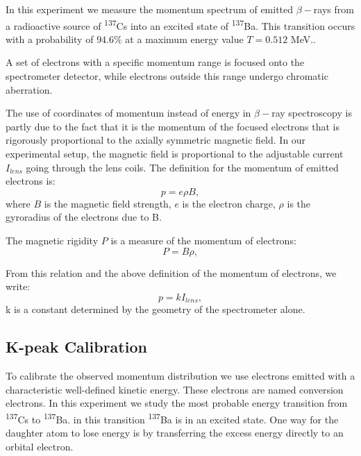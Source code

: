 \documentclass[10pt, a4paper]{article}
\begin{document}
\begin{multicols}{2}
In this experiment we measure the momentum spectrum of emitted $\beta-$rays from a radioactive source of \textsuperscript{137}Cs into an excited state of \textsuperscript{137}Ba. This transition occurs with a probability of $94.6\%$ at a maximum energy value $T = 0.512$ MeV.\cite{SPA}.

A set of electrons with a specific momentum range is focused onto the spectrometer detector, while electrons outside this range undergo chromatic aberration. 

The use of coordinates of momentum instead of energy in $\beta-$ray spectroscopy is partly due to the fact that it is the momentum of the focused electrons that is rigorously proportional to the axially symmetric magnetic field.\cite{QH, Siegbahn} 
In our experimental setup, the magnetic field is proportional to the adjustable current $I_{lens}$ going through the lens coils.
The definition for the momentum of emitted electrons is:
\begin{equation}p = e \rho B,
\end{equation} 
where $B$ is the magnetic field strength, $e$ is the electron charge, $\rho$ is the gyroradius of the electrons due to B.

The magnetic rigidity $P$ is a measure of the momentum of electrons\cite{Wikipedia-Rigidity}:
\begin{equation}P = B \rho,
\end{equation}

From this relation and the above definition of the momentum of electrons, we write:
\begin{equation}p = kI_{lens},
\end{equation}
k is a constant determined by the geometry of the spectrometer alone\cite{QH}.

\subsection{K-peak Calibration}

To calibrate the observed momentum distribution we use electrons emitted with a characteristic well-defined kinetic energy\cite{SPA}.
These electrons are named conversion electrons.
In this experiment we study the most probable energy transition from \textsuperscript{137}Cs to \textsuperscript{137}Ba. in this transition \textsuperscript{137}Ba is in an excited state. 
One way for the daughter atom to lose energy is by transferring the excess energy directly to an orbital electron\cite{SPA}.


\end{multicols}
\end{document}
